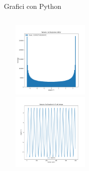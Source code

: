         \begin{frame}{Grafici con Python}
            \begin{columns}
                    \centering        
                    \includegraphics[width=5cm,height=3.75cm]{7_incli/ven_teta.png}\\
                    \label{cfr::in}              
                    \centering        
                    \includegraphics[width=5cm,height=3.75cm]{7_incli/sat_teta_tempo.png}\\
            \end{columns}
        \end{frame}